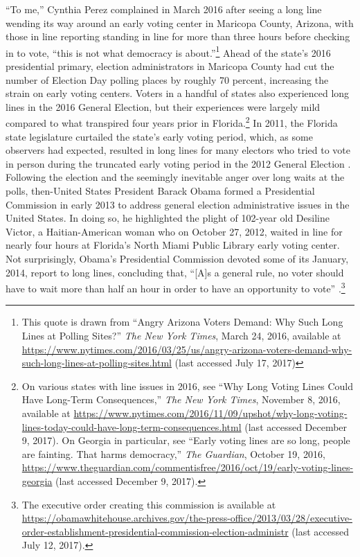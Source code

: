 \documentclass[12pt,titlepage]{article}
\begin{document}
``To me,'' Cynthia Perez complained in March 2016 after seeing a long
line wending its way around an early voting center in Maricopa County,
Arizona, with those in line reporting standing in line for more than
three hours before checking in to vote, ``this is not what democracy
is about.''\footnote{This quote is drawn from ``Angry Arizona Voters
  Demand: Why Such Long Lines at Polling Sites?'' \emph{The New York
    Times}, March 24, 2016, available at
  \url{https://www.nytimes.com/2016/03/25/us/angry-arizona-voters-demand-why-such-long-lines-at-polling-sites.html}
  (last accessed July 17, 2017)} Ahead of the state's 2016
presidential primary, election administrators in Maricopa County had
cut the number of Election Day polling places by roughly 70 percent,
increasing the strain on early voting centers. Voters in a handful of
states also experienced long lines in the 2016 General Election, but
their experiences were largely mild compared to what transpired four
years prior in Florida.\footnote{On various states with line issues in
  2016, see ``Why Long Voting Lines Could Have Long-Term
  Consequences,'' \emph{The New York Times}, November 8, 2016,
  available at
  \url{https://www.nytimes.com/2016/11/09/upshot/why-long-voting-lines-today-could-have-long-term-consequences.html}
  (last accessed December 9, 2017).  On Georgia in particular, see
  ``Early voting lines are so long, people are fainting. That harms
  democracy,'' \emph{The Guardian}, October 19, 2016,
  \url{https://www.theguardian.com/commentisfree/2016/oct/19/early-voting-lines-georgia}
  (last accessed December 9, 2017).}  In 2011, the Florida state
legislature curtailed the state's early voting period, which, as some
observers had expected, resulted in long lines for many electors who
tried to vote in person during the truncated early voting period in
the 2012 General Election \citep{herron_smith2014}.  Following the
election and the seemingly inevitable anger over long waits at the
polls, then-United States President Barack Obama formed a Presidential
Commission in early 2013 to address general election administrative
issues in the United States.  In doing so, he highlighted the plight
of 102-year old Desiline Victor, a Haitian-American woman who on
October 27, 2012, waited in line for nearly four hours at Florida's
North Miami Public Library early voting center.  Not surprisingly,
Obama's Presidential Commission devoted some of its January, 2014,
report to long lines, concluding that, ``[A]s a general rule, no voter
should have to wait more than half an hour in order to have an
opportunity to vote'' \citep[p.\ 13,][]{pcea:2014}.\footnote{The
  executive order creating this commission is available at
  \url{https://obamawhitehouse.archives.gov/the-press-office/2013/03/28/executive-order-establishment-presidential-commission-election-administr}
  (last accessed July 12, 2017).}
\end{document}
